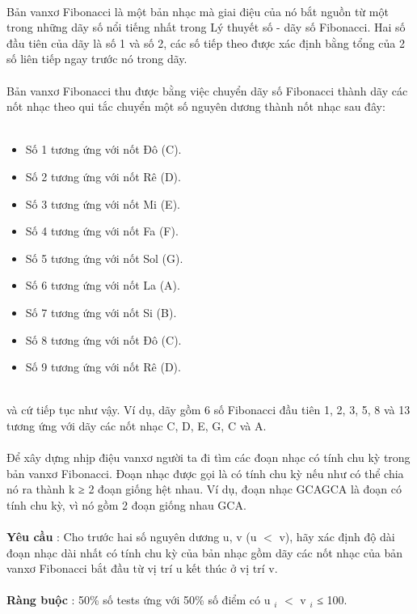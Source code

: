  

Bản vanxơ Fibonacci là một bản nhạc mà giai điệu của nó bắt nguồn từ một trong những dãy số nổi tiếng nhất trong Lý thuyết số - dãy số Fibonacci. Hai số đầu tiên của dãy là số 1 và số 2, các số tiếp theo được xác định bằng tổng của 2 số liên tiếp ngay trước nó trong dãy.
\\
\\Bản vanxơ Fibonacci thu được bằng việc chuyển dãy số Fibonacci thành dãy các nốt nhạc theo qui tắc chuyển một số nguyên dương thành nốt nhạc sau đây:
\\ 
\begin{itemize}
	\item Số 1 tương ứng với nốt Đô (C).
	\item Số 2 tương ứng với nốt Rê (D).
	\item Số 3 tương ứng với nốt Mi (E).
	\item Số 4 tương ứng với nốt Fa (F).
	\item Số 5 tương ứng với nốt Sol (G).
	\item Số 6 tương ứng với nốt La (A).
	\item Số 7 tương ứng với nốt Si (B).
	\item Số 8 tương ứng với nốt Đô (C).
	\item Số 9 tương ứng với nốt Rê (D).
\end{itemize}


\\và cứ tiếp tục như vậy. Ví dụ, dãy gồm 6 số Fibonacci đầu tiên 1, 2, 3, 5, 8 và 13 tương ứng với dãy các nốt nhạc C, D, E, G, C và A.
\\
\\Để xây dựng nhịp điệu vanxơ người ta đi tìm các đoạn nhạc có tính chu kỳ trong bản vanxơ Fibonacci. Đoạn nhạc được gọi là có tính chu kỳ nếu như có thể chia nó ra thành k ≥ 2 đoạn giống hệt nhau. Ví dụ, đoạn nhạc GCAGCA là đoạn có tính chu kỳ, vì nó gồm 2 đoạn giống nhau GCA.
\\
\\\textbf{Yêu cầu } : Cho trước hai số nguyên dương u, v (u $<$ v), hãy xác định độ dài đoạn nhạc dài nhất có tính chu kỳ của bản nhạc gồm dãy các nốt nhạc của bản vanxơ Fibonacci bắt đầu từ vị trí u kết thúc ở vị trí v.
\\
\\\textbf{Ràng buộc } : 50\% số tests ứng với 50\% số điểm có u $_ i $ $<$ v $_ i $ ≤ 100.